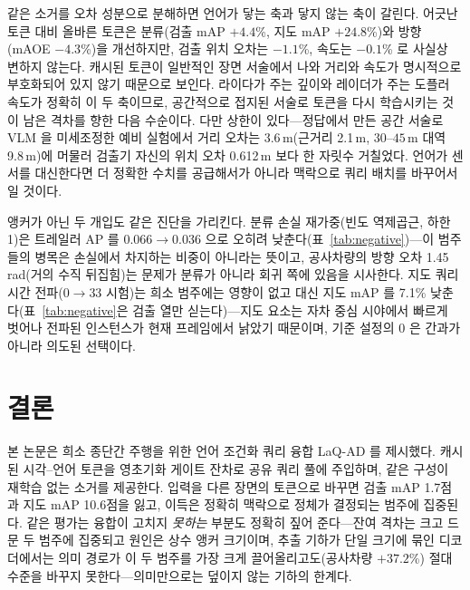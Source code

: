\documentclass[conference]{IEEEtran}
\newcommand{\measured}[1]{#1}
\begin{document}
같은 소거를 오차 성분으로 분해하면 언어가 닿는 축과 닿지 않는 축이 갈린다. 어긋난 토큰
대비 올바른 토큰은 분류(검출 mAP \measured{$+4.4$}\%, 지도 mAP \measured{$+24.8$}\%)와
방향(mAOE \measured{$-4.3$}\%)을 개선하지만, 검출 위치 오차는 \measured{$-1.1$}\%, 속도는
\measured{$-0.1$}\% 로 사실상 변하지 않는다. 캐시된 토큰이 일반적인 장면 서술에서 나와
거리와 속도가 명시적으로 부호화되어 있지 않기 때문으로 보인다. 라이다가 주는 깊이와
레이더가 주는 도플러 속도가 정확히 이 두 축이므로, 공간적으로 접지된 서술로 토큰을 다시
학습시키는 것이 남은 격차를 향한 다음 수순이다. 다만 상한이 있다---정답에서 만든 공간
서술로 VLM 을 미세조정한 예비 실험에서 거리 오차는 \measured{3.6}\,m(근거리
\measured{2.1}\,m, $30$--$45$\,m 대역 \measured{9.8}\,m)에 머물러 검출기 자신의 위치
오차 \measured{0.612}\,m 보다 한 자릿수 거칠었다. 언어가 센서를 대신한다면 더 정확한
수치를 공급해서가 아니라 맥락으로 쿼리 배치를 바꾸어서일 것이다.

앵커가 아닌 두 개입도 같은 진단을 가리킨다. 분류 손실 재가중(빈도 역제곱근, 하한
1)은 트레일러 AP 를 \measured{0.066}$\to$\measured{0.036} 으로 오히려
낮춘다(표~\ref{tab:negative})---이 범주들의 병목은 손실에서 차지하는 비중이 아니라는 뜻이고, 공사차량의 방향 오차
\measured{1.45}\,rad(거의 수직 뒤집힘)는 문제가 분류가 아니라 회귀 쪽에 있음을
시사한다. 지도 쿼리 시간 전파($0\!\to\!33$ 시험)는 희소 범주에는 영향이 없고 대신 지도
mAP 를 \measured{7.1}\% 낮춘다(표~\ref{tab:negative}은 검출 열만 싣는다)---지도 요소는 자차 중심
시야에서 빠르게 벗어나 전파된 인스턴스가 현재 프레임에서 낡았기 때문이며, 기준 설정의
0 은 간과가 아니라 의도된 선택이다.

\section{결론}

본 논문은 희소 종단간 주행을 위한 언어 조건화 쿼리 융합 LaQ-AD 를 제시했다. 캐시된
시각--언어 토큰을 영초기화 게이트 잔차로 공유 쿼리 풀에 주입하며, 같은 구성이 재학습
없는 소거를 제공한다. 입력을 다른 장면의 토큰으로 바꾸면 검출 mAP
\measured{1.7}점과 지도 mAP \measured{10.6}점을 잃고, 이득은 정확히 맥락으로 정체가
결정되는 범주에 집중된다. 같은 평가는 융합이 고치지 \emph{못하는} 부분도 정확히 짚어 준다---잔여
격차는 크고 드문 두 범주에 집중되고 원인은 상수 앵커 크기이며, 추출 기하가 단일 크기에
묶인 디코더에서는 의미 경로가 이 두 범주를 가장 크게 끌어올리고도(공사차량
\measured{$+37.2$}\%) 절대 수준을 바꾸지 못한다---의미만으로는 덮이지 않는 기하의
한계다.
\end{document}
